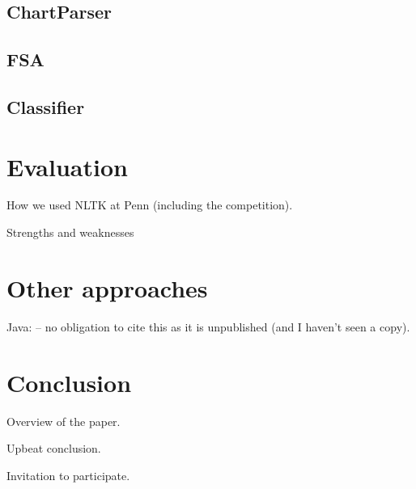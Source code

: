 \documentclass[11pt]{article}
\begin{document}
\subsection{ChartParser}

\subsection{FSA}

\subsection{Classifier}


\section{Evaluation}

How we used NLTK at Penn (including the competition).

Strengths and weaknesses

\section{Other approaches}

Java: \cite{Hammond02}
-- no obligation to cite this as it is unpublished
(and I haven't seen a copy).

\section{Conclusion}

Overview of the paper.

Upbeat conclusion.

Invitation to participate.



\end{document}

